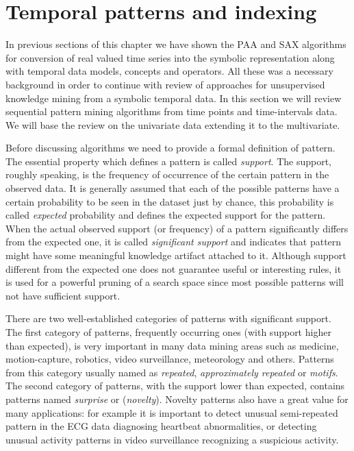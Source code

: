 \section{Temporal patterns and indexing} \label{tpatterns}
In previous sections of this chapter we have shown the PAA and SAX algorithms for conversion of real valued time series into the symbolic representation along with temporal data models, concepts and operators. All these was a necessary background in order to continue with review of approaches for unsupervised knowledge mining from a symbolic temporal data. In this section we will review sequential pattern mining algorithms from time points and time-intervals data. We will base the review on the univariate data extending it to the multivariate.


Before discussing algorithms we need to provide a formal definition of pattern. The essential property which defines a pattern is called \textit{support}. The support, roughly speaking, is the frequency of occurrence of the certain pattern in the observed data. It is generally assumed that each of the possible patterns have a certain probability to be seen in the dataset just by chance, this probability is called \textit{expected} probability and defines the expected support for the pattern. When the actual observed support (or frequency) of a pattern significantly differs from the expected one, it is called \textit{significant support} and indicates that pattern might have some meaningful knowledge artifact attached to it. Although support different from the expected one does not guarantee useful or interesting rules, it is used for a powerful pruning of a search space since most possible patterns will not have sufficient support.

There are two well-established categories of patterns with significant support. The first category of patterns, frequently occurring ones (with support higher than expected), is very important in many data mining areas such as medicine, motion-capture, robotics, video surveillance, meteorology and others. Patterns from this category usually named as \textit{repeated}, \textit{approximately repeated} or \textit{motifs}. The second category of patterns, with the support lower than expected, contains patterns named \textit{surprise} or (\textit{novelty}). Novelty patterns also have a great value for many applications: for example it is important to detect unusual semi-repeated pattern in the ECG data diagnosing heartbeat abnormalities, or detecting unusual activity patterns in video surveillance recognizing a suspicious activity.

